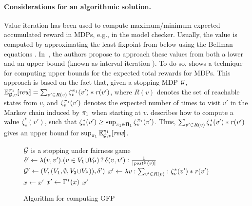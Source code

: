 \paragraph{Considerations for an algorithmic solution.}
Value iteration \cite{Bellman57} has been used to compute maximum/minimum expected accumulated reward in MDPs, e.g., in the {\Prism} model checker.  Usually, the value is computed by approximating the least fixpoint from below using the Bellman equations \cite{Bellman57}. In~\cite{DBLP:conf/cav/Baier0L0W17}, the authors propose to approach these values from both a lower and an upper bound (known as interval iteration \cite{DBLP:journals/tcs/HaddadM18}). To do so,  \cite{DBLP:conf/cav/Baier0L0W17} shows a technique for computing upper bounds for the expected total rewards for MDPs.  This approach is based on the fact that, given a stopping MDP $\mathcal{G}$, $\mathbb{E}^{\pi_{1}}_{\mathcal{G},v}[\textit{rew}] = \sum_{v' \in R(v)} \zeta_v^{\pi_{1}}(v')*\mathit{r}(v')$,  where $R(v)$ denotes the set of reachable states from $v$, and $\zeta_v^{\pi_{1}}(v')$ denotes the  expected number of times to visit $v'$ in the Markov chain
induced by $\pi_{1}$ when starting at $v$.  \cite{DBLP:conf/cav/Baier0L0W17} describes how to compute  a value $\zeta_{v}^*(v')$, such that $\zeta_v^*(v') \geq \sup_{\pi_{1} \in \Pi_{1}} \zeta_v^{\pi_{1}}(v')$. Thus,  $\sum_{v' \in R(v)} \zeta_v^{*}(v')*\mathit{r}(v')$ gives an upper bound for $\sup_{\pi_{1}} \mathbb{E}^{\pi_{1}}_{\mathcal{G},v}[\textit{rew}]$.  
\begin{figure}
    \vspace{-9.5ex}
    \begin{minipage}{0.55\textwidth}
      \begin{algorithm}[H]
        \caption{Algorithm for computing GFP}\label{Alg:gfp}
        \begin{algorithmic}
          \REQUIRE $\mathcal{G}$ is a stopping under fairness game\\[1ex]
          \STATE $\delta' \gets  \lambda (v,v') {.} (v \in V_1 {\cup} V_{\mathsf{P}}) \mathop{?} \delta(v,v') : \frac{1}{|\mathit{post}^{\mathcal{G}}(v)|}$\\[-1ex]
          \STATE  $\mathcal{G}' \gets (V, (V_1, \emptyset, V_2{\cup}V_{\mathsf{P}})), \delta')$
          \STATE $x' \gets \lambda v : \sum_{v' \in R(v)} : \zeta^*_v(v')*\mathit{r}(v')$
          \REPEAT
          \STATE $x \gets x'$
          \STATE $x' \gets \Gamma^*(x)$
          \RETURN $x'$
        \end{algorithmic}
      \end{algorithm}
    \end{minipage}
  \end{figure}
